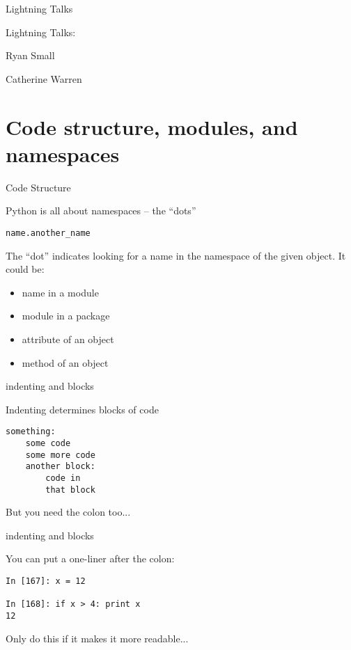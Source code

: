 \documentclass{beamer}
\begin{document}
\begin{frame}[fragile]{Lightning Talks}

{\LARGE Lightning Talks:}

\vfill
Ryan Small

\vfill
Catherine Warren 


\end{frame}


\section{Code structure, modules, and namespaces}

\begin{frame}[fragile]{Code Structure}

{\Large Python is all about namespaces --  the ``dots'' }

\vfill
\verb|name.another_name|

\vfill
The ``dot'' indicates looking for a name in the namespace of the
given object. It could be:

\begin{itemize}
\item name in a module
\item module in a package
\item attribute of an object
\item method of an object
\end{itemize}

\end{frame}

\begin{frame}[fragile]{indenting and blocks}

{\Large  Indenting determines blocks of code }

\vfill
\begin{verbatim}
something:
    some code
    some more code
    another block:
        code in 
        that block
\end{verbatim}

\vfill
{\Large But you need the colon too...}

\end{frame}

\begin{frame}[fragile]{indenting and blocks}

{\Large  You can put a one-liner after the colon:}

\vfill
\begin{verbatim}
In [167]: x = 12

In [168]: if x > 4: print x
12
\end{verbatim}

\vfill
{\Large Only do this if it makes it more readable...}

\end{frame}
\end{document}
